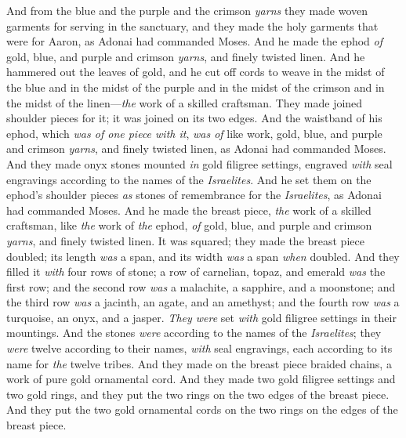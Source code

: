 \begin{biblechapter} %
 And from the blue and the purple and the crimson \textit{yarns} they made woven garments for serving in the sanctuary, and they made the holy garments that were for Aaron, as Adonai had commanded Moses.
\verse And he made the ephod \textit{of} gold, blue, and purple and crimson \textit{yarns}, and finely twisted linen.
\verse And he hammered out the leaves of gold, and he cut off cords to weave in the midst of the blue and in the midst of the purple and in the midst of the crimson and in the midst of the linen—\textit{the} work of a skilled craftsman.
\verse They made joined shoulder pieces for it; it was joined on its two edges.
\verse And the waistband of his ephod, which \textit{was of one piece with it}, \textit{was of} like work, gold, blue, and purple and crimson \textit{yarns}, and finely twisted linen, as Adonai had commanded Moses.
\verse And they made onyx stones mounted \textit{in} gold filigree settings, engraved \textit{with} seal engravings according to the names of the \textit{Israelites}.
\verse And he set them on the ephod’s shoulder pieces \textit{as} stones of remembrance for the \textit{Israelites}, as Adonai had commanded Moses.
\verse And he made the breast piece, \textit{the} work of a skilled craftsman, like \textit{the} work of \textit{the} ephod, \textit{of} gold, blue, and purple and crimson \textit{yarns}, and finely twisted linen.
\verse It was squared; they made the breast piece doubled; its length \textit{was} a span, and its width \textit{was} a span \textit{when} doubled.
\verse And they filled it \textit{with} four rows of stone; a row of carnelian, topaz, and emerald \textit{was} the first row;
\verse and the second row \textit{was} a malachite, a sapphire, and a moonstone;
\verse and the third row \textit{was} a jacinth, an agate, and an amethyst;
\verse and the fourth row \textit{was} a turquoise, an onyx, and a jasper. \textit{They were} set \textit{with} gold filigree settings in their mountings.
\verse And the stones \textit{were} according to the names of the \textit{Israelites}; they \textit{were} twelve according to their names, \textit{with} seal engravings, each according to its name for \textit{the} twelve tribes.
\verse And they made on the breast piece braided chains, a work of pure gold ornamental cord.
\verse And they made two gold filigree settings and two gold rings, and they put the two rings on the two edges of the breast piece.
\verse And they put the two gold ornamental cords on the two rings on the edges of the breast piece.

\end{biblechapter}

